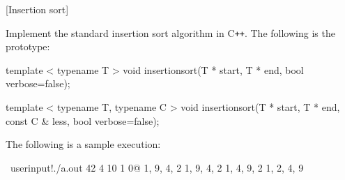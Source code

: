 [Insertion sort]

Implement the standard insertion sort algorithm in C\texttt{++}.
The following is the prototype:
\begin{console}[frame=single, fontsize=\footnotesize]
template < typename T >
void insertionsort(T * start, T * end, bool verbose=false);

template < typename T, typename C >
void insertionsort(T * start, T * end, const C & less, bool verbose=false);
\end{console}

The following is a sample execution:
\begin{console}[frame=single, commandchars=\~\!\@,fontsize=\footnotesize]
~userinput!./a.out 42 4 10 1 0@
{1, 9, 4, 2}
{1, 9, 4, 2}
{1, 4, 9, 2}
{1, 2, 4, 9}
\end{console}

